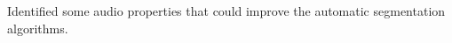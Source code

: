 \documentclass{article}
\begin{document}
Identified some audio properties that could improve the automatic segmentation algorithms.








\end{document}

